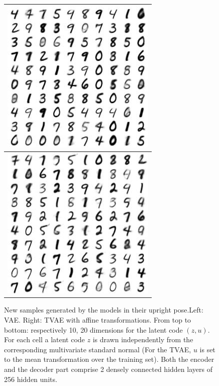 \documentclass[letterpaper, twoside]{article}
\begin{document}
\begin{figure}[H]
\begin{minipage}{.33\textwidth}
\begin{flushleft}
\begin{tabular}{|@{}c@{}|}
\end{tabular}
\end{flushleft}
\end{minipage}%
\begin{minipage}{.33\textwidth}
\begin{tabular}{|@{}c@{}|}\hline
\includegraphics[scale=1]{manifold_126.jpg}\\ \hline
\includegraphics[scale=1]{manifold_127.jpg}\\ \hline
\end{tabular}
\end{minipage}

\caption{New samples generated by the models in their upright pose.Left: VAE. Right: TVAE with affine transformations. From top to bottom: respectively 10, 20 dimensions for the latent code $(z, u)$.\\ For each cell a latent code $z$ is drawn independently from the corresponding multivariate standard normal (For the TVAE, $u$ is set to the mean transformation over the training set). Both the encoder and the decoder part comprise 2 densely connected hidden layers of 256 hidden units.}
\label{generatedcomparison}
\end{figure}
\end{document}

